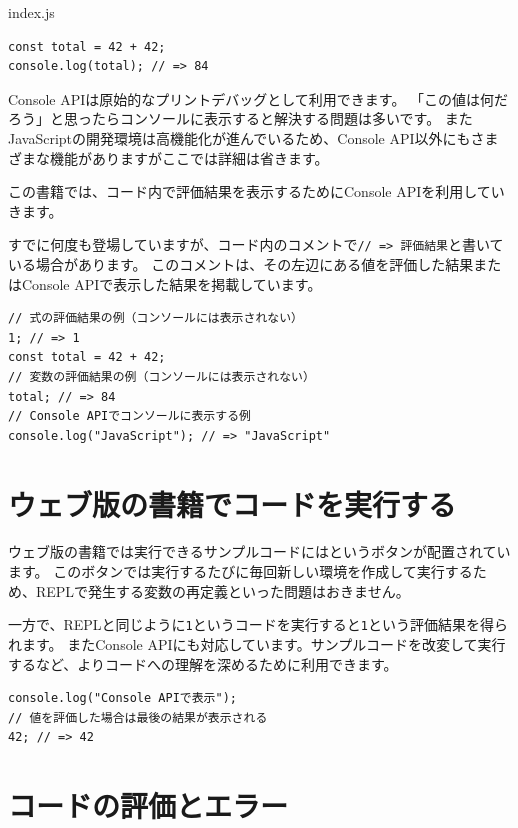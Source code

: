 \begin{listtitle}
index.js
\end{listtitle}
\begin{lstlisting}
const total = 42 + 42;
console.log(total); // => 84
\end{lstlisting}
\listend

Console APIは原始的なプリントデバッグとして利用できます。
「この値は何だろう」と思ったらコンソールに表示すると解決する問題は多いです。
またJavaScriptの開発環境は高機能化が進んでいるため、Console
API以外にもさまざまな機能がありますがここでは詳細は省きます。

この書籍では、コード内で評価結果を表示するためにConsole
APIを利用していきます。

すでに何度も登場していますが、コード内のコメントで\texttt{// => 評価結果}と書いている場合があります。
このコメントは、その左辺にある値を評価した結果またはConsole
APIで表示した結果を掲載しています。

\begin{lstlisting}
// 式の評価結果の例（コンソールには表示されない）
1; // => 1
const total = 42 + 42;
// 変数の評価結果の例（コンソールには表示されない）
total; // => 84
// Console APIでコンソールに表示する例
console.log("JavaScript"); // => "JavaScript"
\end{lstlisting}

\hypertarget{execute-on-web}{%
\section{ウェブ版の書籍でコードを実行する}\label{execute-on-web}}

ウェブ版の書籍では実行できるサンプルコードには\textbf{}というボタンが配置されています。
このボタンでは実行するたびに毎回新しい環境を作成して実行するため、REPLで発生する変数の再定義といった問題はおきません。

一方で、REPLと同じように\texttt{1}というコードを実行すると\texttt{1}という評価結果を得られます。
またConsole
APIにも対応しています。サンプルコードを改変して実行するなど、よりコードへの理解を深めるために利用できます。

\begin{lstlisting}
console.log("Console APIで表示");
// 値を評価した場合は最後の結果が表示される
42; // => 42
\end{lstlisting}

\hypertarget{eval-code-and-error}{%
\section{コードの評価とエラー}\label{eval-code-and-error}}

